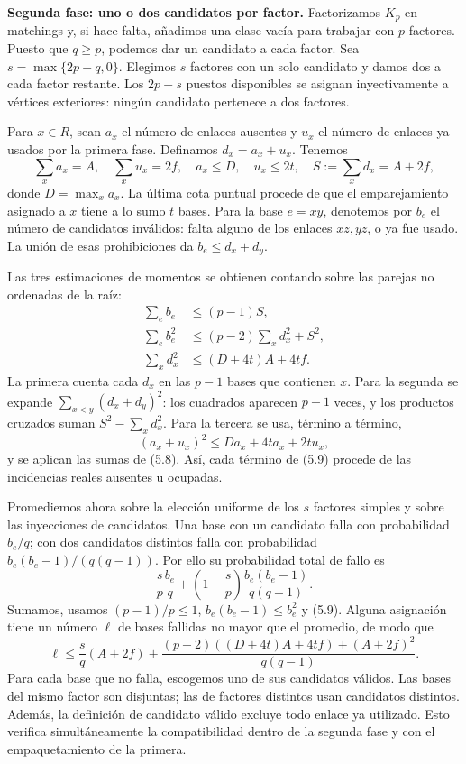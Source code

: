 \documentclass[spanish,11pt,a4paper]{article}
\begin{document}
\textbf{Segunda fase: uno o dos candidatos por factor.} Factorizamos \(K_p\) en matchings y, si hace falta, añadimos una clase vacía para trabajar con \(p\) factores. Puesto que \(q\ge p\), podemos dar un candidato a cada factor. Sea \(s=\max\{2p-q,0\}\). Elegimos \(s\) factores con un solo candidato y damos dos a cada factor restante. Los \(2p-s\) puestos disponibles se asignan inyectivamente a vértices exteriores: ningún candidato pertenece a dos factores.

Para \(x\in R\), sean \(a_x\) el número de enlaces ausentes y \(u_x\) el número de enlaces ya usados por la primera fase. Definamos \(d_x=a_x+u_x\). Tenemos \[
\sum_xa_x=A,\quad \sum_xu_x=2f,\quad
a_x\le D,\quad u_x\le2t,\quad
S:=\sum_xd_x=A+2f,
\tag{5.8}
\] donde \(D=\max_xa_x\). La última cota puntual procede de que el emparejamiento asignado a \(x\) tiene a lo sumo \(t\) bases. Para la base \(e=xy\), denotemos por \(b_e\) el número de candidatos inválidos: falta alguno de los enlaces \(xz,yz\), o ya fue usado. La unión de esas prohibiciones da \(b_e\le d_x+d_y\).

Las tres estimaciones de momentos se obtienen contando sobre las parejas no ordenadas de la raíz: \[
\begin{aligned}
\sum_e b_e&\le(p-1)S,\\
\sum_e b_e^2&\le(p-2)\sum_xd_x^2+S^2,\\
\sum_xd_x^2&\le(D+4t)A+4tf.
\end{aligned}
\tag{5.9}
\] La primera cuenta cada \(d_x\) en las \(p-1\) bases que contienen \(x\). Para la segunda se expande \(\sum_{x<y}(d_x+d_y)^2\): los cuadrados aparecen \(p-1\) veces, y los productos cruzados suman \(S^2-\sum_xd_x^2\). Para la tercera se usa, término a término, \[
(a_x+u_x)^2\le Da_x+4ta_x+2tu_x,
\] y se aplican las sumas de (5.8). Así, cada término de (5.9) procede de las incidencias reales ausentes u ocupadas.

Promediemos ahora sobre la elección uniforme de los \(s\) factores simples y sobre las inyecciones de candidatos. Una base con un candidato falla con probabilidad \(b_e/q\); con dos candidatos distintos falla con probabilidad \(b_e(b_e-1)/(q(q-1))\). Por ello su probabilidad total de fallo es \[
\frac{s}{p}\frac{b_e}{q}
+\left(1-\frac{s}{p}\right)\frac{b_e(b_e-1)}{q(q-1)}.
\tag{5.10}
\] Sumamos, usamos \((p-1)/p\le1\), \(b_e(b_e-1)\le b_e^2\) y (5.9). Alguna asignación tiene un número \(\ell\) de bases fallidas no mayor que el promedio, de modo que \[
\ell\le\frac{s}{q}(A+2f)
+\frac{(p-2)((D+4t)A+4tf)+(A+2f)^2}{q(q-1)}.
\tag{5.11}
\] Para cada base que no falla, escogemos uno de sus candidatos válidos. Las bases del mismo factor son disjuntas; las de factores distintos usan candidatos distintos. Además, la definición de candidato válido excluye todo enlace ya utilizado. Esto verifica simultáneamente la compatibilidad dentro de la segunda fase y con el empaquetamiento de la primera.
\end{document}
